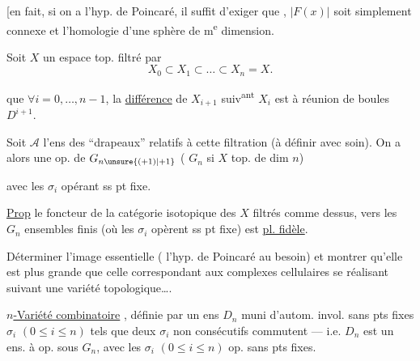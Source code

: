 [en fait,  si on a l'hyp. de Poincaré, il suffit d'exiger que , $|F(x)|$ soit simplement connexe et   l'homologie d'une sphère de m\textsuperscript{e} dimension.


Soit $X$ un espace top.  filtré par
\[
 X_0\subset X_1\subset\ldots\subset X_n=X.
\]
 

que $\forall i=0,\ldots,n-1$, la \uline{différence} de $X_{i+1}$ suiv\textsuperscript{ant} $X_i$ est   à   réunion de boules $D^{i+1}$.

Soit $\mathcal A$ l'ens des ``drapeaux'' relatifs à cette filtration (à définir avec soin). On a alors une op. de $G_{n\unsure{(+1)|+1}}$ ( $G_n$ si $X$  top. de dim $n$)


avec les $\sigma_i$ opérant ss pt fixe.

\uline{Prop} le foncteur de la catégorie isotopique des  $X$ filtrés comme dessus, vers les $G_n$ ensembles finis (où les $\sigma_i$ opèrent ss pt fixe) est \uline{pl. fidèle}.

Déterminer l'image essentielle ( l'hyp. de Poincaré au besoin) et montrer qu'elle est plus grande que celle correspondant aux complexes cellulaires se réalisant suivant une variété topologique\ldots.

\uline{$n$-Variété combinatoire} , définie par un ens  $D_n$ muni d'autom. invol. sans pts fixes $\sigma_i$ $(0\leq i\leq n)$ tels que deux $\sigma_i$ \unsure{:} non consécutifs commutent --- i.e. $D_n$ est un ens. à op. sous $G_n$, avec les $\sigma_i$ $(0\leq i\leq n)$ op. sans pts fixes.

